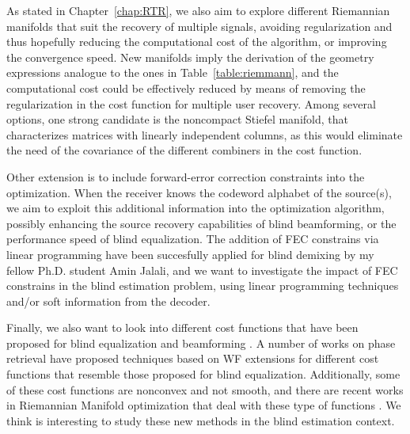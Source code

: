 As stated in Chapter~\ref{chap:RTR}, we also aim to explore different Riemannian manifolds that suit the recovery of multiple signals, avoiding regularization and thus hopefully reducing the computational cost of the algorithm, or improving the convergence speed. New manifolds imply the derivation of the geometry expressions analogue to the ones in Table~\ref{table:riemmann}, and the computational cost could be effectively reduced by means of removing the regularization in the cost function for multiple user recovery. Among several options, one strong candidate is the noncompact Stiefel manifold, that characterizes matrices with linearly independent columns, as this would eliminate the need of the covariance of the different combiners in the cost function. 

Other extension is to include forward-error correction constraints into the optimization. When the receiver knows the codeword alphabet of the source(s), we aim to exploit this additional information into the optimization algorithm, possibly enhancing the source recovery capabilities of blind beamforming, or the performance speed of blind equalization. The addition of FEC constrains via linear programming have been succesfully applied for blind demixing by my fellow Ph.D. student Amin Jalali, and we want to investigate the impact of FEC constrains in the blind estimation problem, using linear programming techniques and/or soft information from the decoder.

Finally, we also want to look into different cost functions that have been proposed for blind equalization and beamforming \cite{Benveniste1980bgr,Sato1975,Shalvi1990}. A number of works on phase retrieval have proposed techniques based on WF extensions for different cost functions \cite{Zhang2016mediantruncatedwf,Cai2016thresholdedwf,Lazreg2018optimasparselrobustwf} that resemble those proposed for blind equalization. Additionally, some of these cost functions are nonconvex and not smooth, and there are recent works in Riemannian Manifold optimization that deal with these type of functions \cite{Kovnatsky2016madmmriemann,Absil2019nonsmoothriemannian}. We think is interesting to study these new methods in the blind estimation context.



